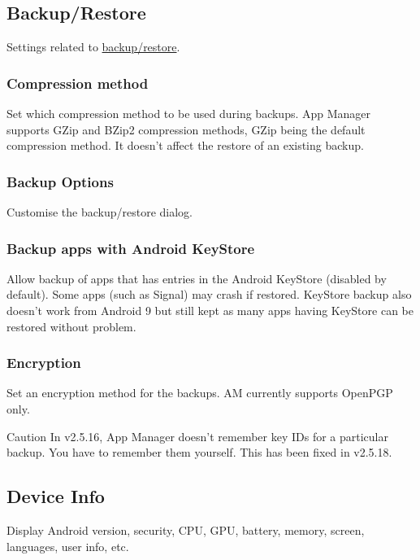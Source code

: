 \subsection{Backup/Restore}\label{subsec:backup/restore}
Settings related to \hyperref[sec:backup-restore]{backup/restore}.

\subsubsection{Compression method}
Set which compression method to be used during backups. App Manager supports GZip and BZip2 compression methods, GZip
being the default compression method. It doesn't affect the restore of an existing backup.

\subsubsection{Backup Options}\label{subsubsec:settings-backup-options}
Customise the backup/restore dialog.

\subsubsection{Backup apps with Android KeyStore}
Allow backup of apps that has entries in the Android KeyStore (disabled by default). Some apps (such as Signal) may
crash if restored. KeyStore backup also doesn't work from Android 9 but still kept as many apps having KeyStore can be
restored without problem.

\subsubsection{Encryption}\label{subsubsec:settings-encryption}
Set an encryption method for the backups. AM currently supports OpenPGP only.

\begin{warning}{Caution}
    In v2.5.16, App Manager doesn't remember key IDs for a particular backup. You have to remember them yourself. This has been fixed in v2.5.18.
\end{warning}

\subsection{Device Info}\label{subsec:device-info}
Display Android version, security, CPU, GPU, battery, memory, screen, languages, user info, etc.
